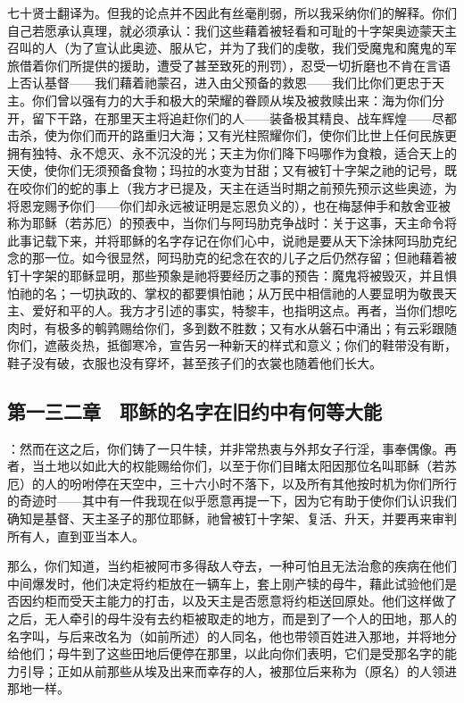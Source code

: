 七十贤士翻译为。但我的论点并不因此有丝毫削弱，所以我采纳你们的解释。你们自己若愿承认真理，就必须承认：我们这些藉着被轻看和可耻的十字架奥迹蒙天主召叫的人（为了宣认此奥迹、服从它，并为了我们的虔敬，我们受魔鬼和魔鬼的军旅借着你们所提供的援助，遭受了甚至致死的刑罚），忍受一切折磨也不肯在言语上否认基督——我们藉着祂蒙召，进入由父预备的救恩——我们比你们更忠于天主。你们曾以强有力的大手和极大的荣耀的眷顾从埃及被救赎出来：海为你们分开，留下干路，在那里天主将追赶你们的人——装备极其精良、战车辉煌——尽都击杀，使为你们而开的路重归大海；又有光柱照耀你们，使你们比世上任何民族更拥有独特、永不熄灭、永不沉没的光；天主为你们降下吗哪作为食粮，适合天上的天使，使你们无须预备食物；玛拉的水变为甘甜；又有被钉十字架之祂的记号，既在咬你们的蛇的事上（我方才已提及，天主在适当时期之前预先预示这些奥迹，为将恩宠赐予你们——你们却永远被证明是忘恩负义的），也在梅瑟伸手和敖舍亚被称为耶稣（若苏厄）的预表中，当你们与阿玛肋克争战时：关于这事，天主命令将此事记载下来，并将耶稣的名字存记在你们心中，说祂是要从天下涂抹阿玛肋克纪念的那一位。如今很显然，阿玛肋克的纪念在农的儿子之后仍然存留；但祂藉着被钉十字架的耶稣显明，那些预象是祂将要经历之事的预告：魔鬼将被毁灭，并且惧怕祂的名；一切执政的、掌权的都要惧怕祂；从万民中相信祂的人要显明为敬畏天主、爱好和平的人。我方才引述的事实，特黎丰，也指明这点。再者，当你们想吃肉时，有极多的鹌鹑赐给你们，多到数不胜数；又有水从磐石中涌出；有云彩跟随你们，遮蔽炎热，抵御寒冷，宣告另一种新天的样式和意义；你们的鞋带没有断，鞋子没有破，衣服也没有穿坏，甚至孩子们的衣裳也随着他们长大。\par


\subsection{第一三二章　耶稣的名字在旧约中有何等大能}

：然而在这之后，你们铸了一只牛犊，并非常热衷与外邦女子行淫，事奉偶像。再者，当土地以如此大的权能赐给你们，以至于你们目睹太阳因那位名叫耶稣（若苏厄）的人的吩咐停在天空中，三十六小时不落下，以及所有其他按时机为你们所行的奇迹时——其中有一件我现在似乎愿意再提一下，因为它有助于使你们认识我们确知是基督、天主圣子的那位耶稣，祂曾被钉十字架、复活、升天，并要再来审判所有人，直到亚当本人。\par

那么，你们知道，当约柜被阿市多得敌人夺去，一种可怕且无法治愈的疾病在他们中间爆发时，他们决定将约柜放在一辆车上，套上刚产犊的母牛，藉此试验他们是否因约柜而受天主能力的打击，以及天主是否愿意将约柜送回原处。他们这样做了之后，无人牵引的母牛没有去约柜被取走的地方，而是到了一个人的田地，那人的名字叫，与后来改名为（如前所述）的人同名，他也带领百姓进入那地，并将地分给他们；母牛到了这些田地后便停在那里，以此向你们表明，它们是受那名字的能力引导；正如从前那些从埃及出来而幸存的人，被那位后来称为（原名）的人领进那地一样。\par

